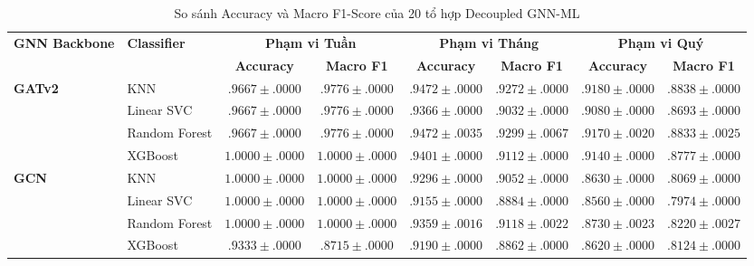 \newpage
\begin{landscape}
\begin{table}[htbp]
\centering
\renewcommand{\arraystretch}{1.35}
\setlength{\tabcolsep}{8pt} %

\caption{So sánh Accuracy và Macro F1-Score của 20 tổ hợp Decoupled GNN-ML}
\label{tab:full_gnn_ml_comparison_with_std}

\begin{tabular}{llcccccc}
\toprule
\multirow{2}{*}{\textbf{GNN Backbone}} & \multirow{2}{*}{\textbf{Classifier}}
& \multicolumn{2}{c}{\textbf{Phạm vi Tuần}}
& \multicolumn{2}{c}{\textbf{Phạm vi Tháng}}
& \multicolumn{2}{c}{\textbf{Phạm vi Quý}} \\
\cmidrule(lr){3-4} \cmidrule(lr){5-6} \cmidrule(lr){7-8}
 & & \textbf{Accuracy} & \textbf{Macro F1} & \textbf{Accuracy} & \textbf{Macro F1} & \textbf{Accuracy} & \textbf{Macro F1} \\
\midrule

\multirow{4}{*}{\textbf{GATv2}}
& KNN            & $.9667 \pm .0000$ & $.9776 \pm .0000$ 
                 & $.9472 \pm .0000$ & $.9272 \pm .0000$ 
                 & $.9180 \pm .0000$ & $.8838 \pm .0000$ \\
& Linear SVC     & $.9667 \pm .0000$ & $.9776 \pm .0000$ 
                 & $.9366 \pm .0000$ & $.9032 \pm .0000$ 
                 & $.9080 \pm .0000$ & $.8693 \pm .0000$ \\
& Random Forest  & $.9667 \pm .0000$ & $.9776 \pm .0000$ 
                 & $\mathbf{.9472 \pm .0035}$ & $\mathbf{.9299 \pm .0067}$ 
                 & $\mathbf{.9170 \pm .0020}$ & $\mathbf{.8833 \pm .0025}$ \\
& XGBoost        & $1.0000 \pm .0000$ & $1.0000 \pm .0000$ 
                 & $.9401 \pm .0000$ & $.9112 \pm .0000$ 
                 & $.9140 \pm .0000$ & $.8777 \pm .0000$ \\
\midrule

\multirow{4}{*}{\textbf{GCN}}
& KNN            & $1.0000 \pm .0000$ & $1.0000 \pm .0000$ 
                 & $.9296 \pm .0000$ & $.9052 \pm .0000$ 
                 & $.8630 \pm .0000$ & $.8069 \pm .0000$ \\
& Linear SVC     & $1.0000 \pm .0000$ & $1.0000 \pm .0000$ 
                 & $.9155 \pm .0000$ & $.8884 \pm .0000$ 
                 & $.8560 \pm .0000$ & $.7974 \pm .0000$ \\
& Random Forest  & $1.0000 \pm .0000$ & $1.0000 \pm .0000$ 
                 & $.9359 \pm .0016$ & $.9118 \pm .0022$ 
                 & $.8730 \pm .0023$ & $.8220 \pm .0027$ \\
& XGBoost        & $.9333 \pm .0000$ & $.8715 \pm .0000$ 
                 & $.9190 \pm .0000$ & $.8862 \pm .0000$ 
                 & $.8620 \pm .0000$ & $.8124 \pm .0000$ \\
\midrule


\end{tabular}
\end{table}
\end{landscape}
